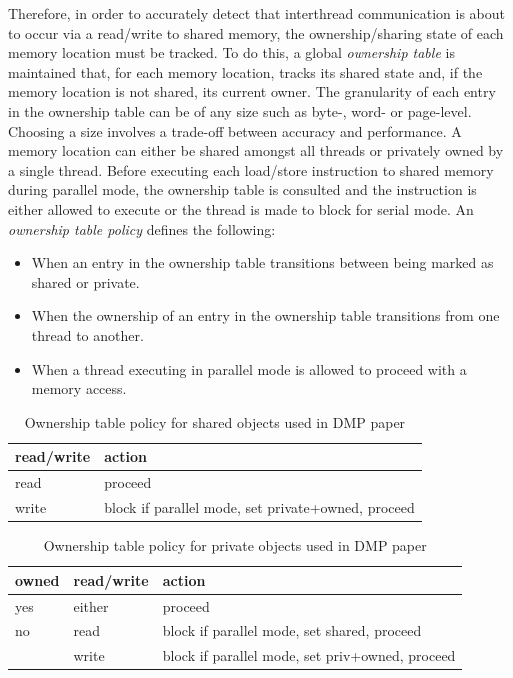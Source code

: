 Therefore, in order to accurately detect that interthread
communication is about to occur via a read/write to shared memory, the
ownership/sharing state of each memory location must be tracked.  To
do this, a global \emph{ownership table} is maintained that, for each
memory location, tracks its shared state and, if the memory location
is not shared, its current owner.  The granularity of each entry in
the ownership table can be of any size such as byte-, word- or
page-level.  Choosing a size involves a trade-off between accuracy and
performance.  A memory location can either be shared amongst all
threads or privately owned by a single thread.  Before executing each
load/store instruction to shared memory during parallel mode, the
ownership table is consulted and the instruction is either allowed to
execute or the thread is made to block for serial mode.  An
\emph{ownership table policy} defines the following:

\begin{itemize}
\item When an entry in the ownership table transitions between being
  marked as shared or private.

\item When the ownership of an entry in the ownership table
  transitions from one thread to another.

\item When a thread executing in parallel mode is allowed to proceed
  with a memory access.
\end{itemize}

\begin{table}
  \begin{tabular}{l|l}
    read/write &  action                                             \\
    \hline
    read       &  proceed                                            \\
    write      &  block if parallel mode, set private+owned, proceed \\
  \end{tabular}
  \caption{Ownership table policy for shared objects used in DMP paper}
  \label{table:ownership-policy-shared}
\end{table}

\begin{table}
  \begin{tabular}{l|l|l}
    owned & read/write &  action                                          \\
    \hline       
    yes   &  either    &  proceed                                         \\
    no    &  read      &  block if parallel mode, set shared, proceed     \\
          &  write     &  block if parallel mode, set priv+owned, proceed \\
  \end{tabular}
  \caption{Ownership table policy for private objects used in DMP paper}
  \label{table:ownership-policy-private}
\end{table}

